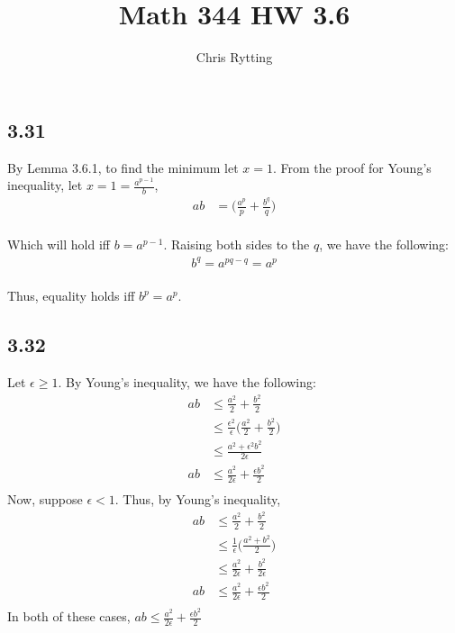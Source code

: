\documentclass[letterpaper,12pt]{article}
\title{Math 344 HW 3.6}
\author{Chris Rytting}
\theoremstyle{definition}
\begin{document}
\maketitle
\subsection*{3.31}
By Lemma 3.6.1, to find the minimum let $x = 1$. From the proof for Young's inequality, let $x = 1 = \frac{a^{p-1}}{b}$, \\
\begin{align*}
    ab & = \big( \frac{a^p}{p} + \frac{b^q}{q} \big)
\end{align*}\\
Which will hold iff $ b = a^{p-1}$. Raising both sides to the $q$, we have the following:\\
\begin{align*}
    b^q = a^{pq-q} = a^p
\end{align*}\\
Thus, equality holds iff $b^p = a ^p$.

\subsection*{3.32}
Let $\epsilon \geq 1$. By Young's inequality, we have the following:
\begin{align*}
    ab & \leq \frac{a^2}{2} + \frac{b^2}{2} \\
    & \leq \frac{\epsilon ^2}{\epsilon}\big( \frac{a^2}{2} + \frac{b^2}{2} \big)\\
    & \leq  \frac{a^2 + \epsilon^2 b^2}{2\epsilon} \\
    ab & \leq \frac{a^2}{2\epsilon} + \frac{\epsilon b^2}{2} \\
\end{align*}
Now, suppose $\epsilon < 1$. Thus, by Young's inequality, 
\begin{align*}
    ab & \leq \frac{a^2}{2} + \frac{b^2}{2} \\
    & \leq \frac{1}{\epsilon}\big( \frac{a^2 + b^2}{2} \big)\\
    & \leq \frac{a^2}{2\epsilon} + \frac{b^2}{2\epsilon} \\
    ab & \leq \frac{a^2}{2\epsilon} + \frac{\epsilon b^2}{2} \\
\end{align*}
In both of these cases, $ab \leq \frac{a^2}{2\epsilon} + \frac{\epsilon b^2}{2}$\\
\end{document}
